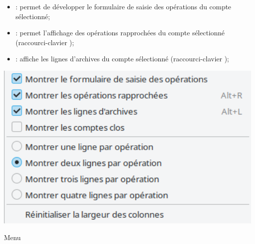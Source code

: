 \vspace{3mm}
\noindent
\begin{minipage}{.7\linewidth}
	\begin{itemize}[rightmargin=.6cm]
		\item {}: permet de développer le formulaire de saisie des opérations du compte sélectionné;
		\item {}: permet l'affichage des opérations rapprochées du compte sélectionné (raccourci-clavier );
		\item {}: affiche les lignes d'archives du compte sélectionné (raccourci-clavier );
	\end{itemize}
\end{minipage}
\hspace{10pt}	
\begin{minipage}{.3\linewidth}
	\centering						%
	\includegraphics[width=1\textwidth]{image/screenshot/home_menubar_view}
	\vspace{-20pt}					%
	\captionsetup{
		type=figure,%
		name=Fig.,%
		labelsep=newline}			%
	\caption{Menu }	%
	\label{home_menubar_view}
\end{minipage} 
